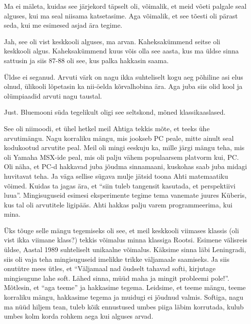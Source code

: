 Ma ei mäleta, kuidas see järjekord täpselt oli, võimalik, et meid võeti palgale seal alguses, kui ma seal niisama katsetasime. Aga võimalik, et see tõesti oli pärast seda, kui me esimesed asjad ära tegime.


Jah, see oli vist keskkooli alguses, ma arvan. Kaheksakümmend seitse oli keskkooli algus. Kaheksakümmend kuus võis olla see aasta, kus ma üldse sinna sattusin ja siis 87-88 oli see, kus palka hakkasin saama. 


Üldse ei seganud. Arvuti värk on nagu ikka suhteliselt kogu aeg põhiline asi elus olnud, ülikooli lõpetasin ka nii-öelda kõrvalhobina ära.  Aga juba siis olid kool ja olümpiaadid arvuti nagu taustal.


Just. Bluemooni süda tegelikult oligi see seltskond, mõned klassikaaslased. 


See oli niimoodi, et ühel hetkel meil Ahtiga tekkis mõte, et teeks ühe arvutimängu.  Nagu korraliku mängu, mis jookseb PC peale, mitte ainult seal kodukootud arvutite peal. Meil oli mingi eeskuju ka, mille järgi  mängu teha, mis oli Yamaha MSX-ide peal, mis oli palju vähem populaarsem platvorm kui, PC. Oli näha, et PC-d hakkavad juba jõudma sinnamaani, kuskohas saab juba midagi huvitavat teha. Ja väga sellise sügava mulje jätsid toona Ahti matemaatiku võimed. Kuidas ta jagas ära, et \enquote{siin tuleb tangensit kasutada, et  perspektiivi luua}. Mingisuguseid esimesi eksperimente tegime tema vanemate juures Küberis, kus tal oli arvutitele ligipääs. Ahti hakkas palju varem programmeerima, kui mina. 

Üks tõuge selle mängu tegemiseks oli see, et meil keskkooli viimases klassis (oli vist ikka viimane klass?) tekkis võimalus minna klassiga Rootsi. Esimene välisreis üldse, Aastal 1989 suhteliselt unikaalne võimalus. Käksime sinna läbi Leningradi, siis oli vaja teha mingisuguseid imelikke trikke väljamaale saamiseks. Ja siis onutütre mees ütles, et \enquote{Väljamaal nad õudselt tahavad softi, kirjutage mingisugune lahe soft. Lähed sinna, müüd maha ja mingit probleemi pole!}. Mõtlesin, et \enquote{aga teeme} ja hakkasime tegema. Leidsime, et teeme mängu, teeme korraliku mängu, hakkasime tegema ja muidugi ei jõudnud valmis. Softiga, nagu ma nüüd hiljem tean, tuleb kõik ennustused  umbes piiga läbim korrutada, kulub umbes kolm korda rohkem aega kui alguses arvad. 

